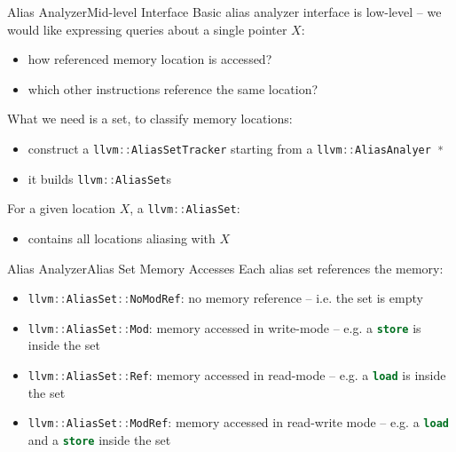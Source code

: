 \documentclass[10pt,mathserif]{beamer}
\newcommand{\cppinline}[1]{\lstinline[language=C++]!#1!}
\newcommand{\llvminline}[1]{\lstinline[language=LLVM]!#1!}
\begin{document}
\begin{frame}{Alias Analyzer}{Mid-level Interface}
Basic alias analyzer interface is low-level -- we would like expressing queries
about a single pointer $X$:

\begin{itemize}
\item how referenced memory location is accessed?
\item which other instructions reference the same location?
\end{itemize}

What we need is a set, to classify memory locations:

\begin{itemize}
\item construct a \cppinline{llvm::AliasSetTracker} starting from a
      \cppinline{llvm::AliasAnalyer *}
\item it builds \cppinline{llvm::AliasSet}s
\end{itemize}

For a given location $X$, a \cppinline{llvm::AliasSet}:

\begin{itemize}
\item contains all locations aliasing with $X$
\end{itemize}
\end{frame}

\begin{frame}{Alias Analyzer}{Alias Set Memory Accesses}
Each alias set \alert{references} the memory:

\begin{itemize}
\item \cppinline{llvm::AliasSet::NoModRef}: no memory reference -- i.e. the set
      is empty
\item \cppinline{llvm::AliasSet::Mod}: memory accessed in write-mode -- e.g. a
      \llvminline{store} is inside the set
\item \cppinline{llvm::AliasSet::Ref}: memory accessed in read-mode -- e.g. a
      \llvminline{load} is inside the set
\item \cppinline{llvm::AliasSet::ModRef}: memory accessed in read-write mode --
      e.g. a \llvminline{load} and a \llvminline{store} inside the set
\end{itemize}
\end{frame}
\end{document}
